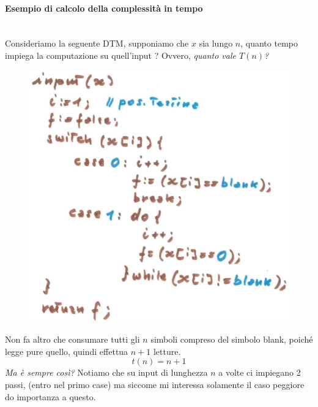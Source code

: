 \documentclass{article}
\begin{document}
\paragraph{Esempio di calcolo della complessità in tempo}\mbox{}\\
Consideriamo la seguente DTM, supponiamo che $x$ sia lungo $n$, quanto
tempo impiega la computazione su quell'input ? Ovvero, \textit{quanto
vale $T(n)$?}
\begin{figure}
    \centering
    \includegraphics[scale=0.5]{images/pseudo_DTM.png}
\end{figure}
Non fa altro che consumare tutti gli $n$ simboli compreso del simbolo blank,
poiché legge pure quello, quindi effettua $n+1$ letture.
$$t(n)=n+1$$
\textit{Ma è sempre così?} Notiamo che su input di lunghezza $n$ a volte
ci impiegano 2 passi, (entro nel primo case) ma siccome mi interessa
solamente il caso peggiore do importanza a questo.
\end{document}

